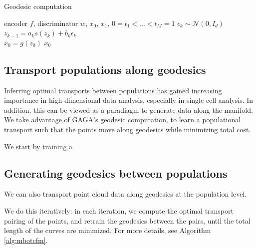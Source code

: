 \documentclass{article}
\theoremstyle{plain}
\theoremstyle{definition}
\theoremstyle{remark}
\newcommand{\methodshort}{GAGA\xspace}
\newcommand{\xin}[1]{\textcolor{teal}{[XS: #1]}}
\begin{document}
\begin{algorithm}[htbp]
\caption{Geodesic computation}
\begin{algorithmic}[1]
 encoder $f$, discriminator $w$, $x_0$, $x_1$, $0=t_1<\dots<t_M=1$
    \State $\epsilon_k \sim \mathcal{N}(0, I_d)$
    \State $z_{k-1} = a_k s(z_k) + b_k \epsilon_k$ \\
\EndFor
\State $x_0 = g(z_0)$
\State \Return $x_0$
\end{algorithmic}\label{alg:geod}
\end{algorithm}
\subsection{Transport populations along geodesics}
\par Inferring optimal transports between populations has gained increasing importance in high-dimensional data analysis, especially in single cell analysis\cite{huguet2022manifold}. In addition, this can be viewed as a paradiagm to generate data along the manifold. We take advantage of \methodshort's geodesic computation, to learn a populational transport such that the points move along geodesics while minimizing total cost.
\par We start by training a 

\subsection{Generating geodesics between populations}
We can also transport point cloud data along geodesics at the population level\cite{fasina2023neural}.
\par We do this iteratively: in each iteration, we compute the optimal transport pairing of the points, and retrain the geodesics between the pairs, until the total length of the curves are minimized. For more details, see Algorithm \ref{alg:mbotcfm}.
\end{document}
